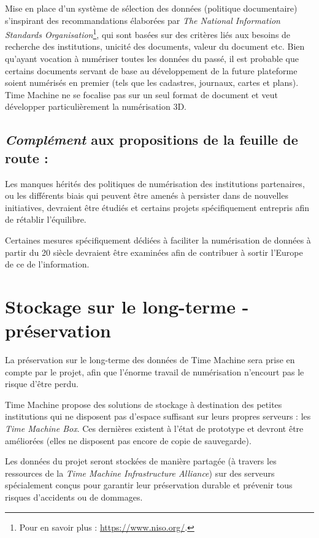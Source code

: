Mise en place d'un système de sélection des données (politique documentaire) s'inspirant des recommandations élaborées par \textit{The National Information Standards Organisation}\footnote{Pour en savoir plus : \url{https://www.niso.org/}.}, qui sont basées sur des critères liés aux besoins de recherche des institutions, unicité des documents, valeur du document etc. Bien qu'ayant vocation à numériser toutes les données du passé, il est probable que certains documents servant de base au développement de la future plateforme soient numérisés en premier (tels que les cadastres, journaux, cartes et plans). Time Machine ne se focalise pas sur un seul format de document et veut développer particulièrement la numérisation 3D.

\subsection{\textit{Complément} aux propositions de la feuille de route :}
Les manques hérités des politiques de numérisation des institutions partenaires, ou les différents biais qui peuvent être amenés à persister dans de nouvelles initiatives, devraient être étudiés et certains projets spécifiquement entrepris afin de rétablir l'équilibre.

Certaines mesures spécifiquement dédiées à faciliter la numérisation de données à partir du 20 siècle devraient être examinées afin de contribuer à sortir l'Europe de ce  de l'information.


\section {Stockage sur le long-terme - préservation}

La préservation sur le long-terme des données de Time Machine sera prise en compte par le projet, afin que l'énorme travail de numérisation n'encourt pas le risque d'être perdu.

Time Machine propose des solutions de stockage à destination des petites institutions qui ne disposent pas d'espace suffisant sur leurs propres serveurs : les \textit{Time Machine Box}. Ces dernières existent à l'état de prototype et devront être améliorées (elles ne disposent pas encore de copie de sauvegarde).

Les données du projet seront stockées de manière partagée (à travers les ressources de la \textit{Time Machine Infrastructure Alliance}) sur des serveurs  spécialement conçus pour garantir leur préservation durable et prévenir tous risques d'accidents ou de dommages. 

